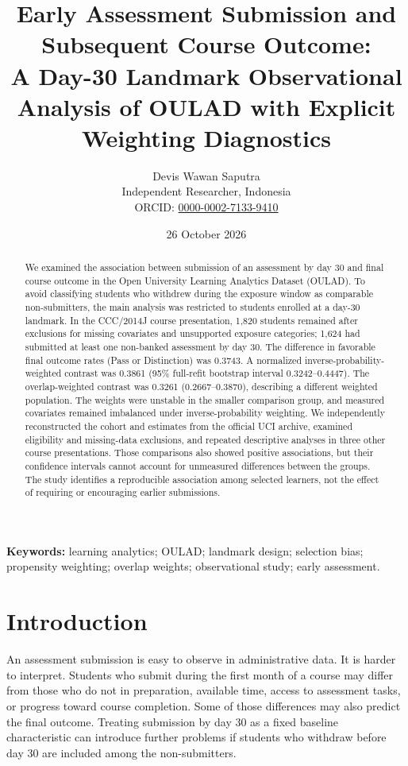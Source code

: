 \documentclass[10pt,a4paper]{article}
\title{Early Assessment Submission and Subsequent Course Outcome:\\ \large A Day-30 Landmark Observational Analysis of OULAD with Explicit Weighting Diagnostics}
\author{Devis Wawan Saputra\\\small Independent Researcher, Indonesia\\\small ORCID: \href{https://orcid.org/0000-0002-7133-9410}{0000-0002-7133-9410}}
\date{26 October 2026}
\begin{document}
\maketitle
\begin{abstract}
We examined the association between submission of an assessment by day 30 and final course outcome in the Open University Learning Analytics Dataset (OULAD). To avoid classifying students who withdrew during the exposure window as comparable non-submitters, the main analysis was restricted to students enrolled at a day-30 landmark. In the CCC/2014J course presentation, 1,820 students remained after exclusions for missing covariates and unsupported exposure categories; 1,624 had submitted at least one non-banked assessment by day 30. The difference in favorable final outcome rates (Pass or Distinction) was 0.3743. A normalized inverse-probability-weighted contrast was 0.3861 (95\% full-refit bootstrap interval 0.3242--0.4447). The overlap-weighted contrast was 0.3261 (0.2667--0.3870), describing a different weighted population. The weights were unstable in the smaller comparison group, and measured covariates remained imbalanced under inverse-probability weighting. We independently reconstructed the cohort and estimates from the official UCI archive, examined eligibility and missing-data exclusions, and repeated descriptive analyses in three other course presentations. Those comparisons also showed positive associations, but their confidence intervals cannot account for unmeasured differences between the groups. The study identifies a reproducible association among selected learners, not the effect of requiring or encouraging earlier submissions.

\end{abstract}
\textbf{Keywords:} learning analytics; OULAD; landmark design; selection bias; propensity weighting; overlap weights; observational study; early assessment.
\section{Introduction}
An assessment submission is easy to observe in administrative data. It is harder to interpret. Students who submit during the first month of a course may differ from those who do not in preparation, available time, access to assessment tasks, or progress toward course completion. Some of those differences may also predict the final outcome. Treating submission by day 30 as a fixed baseline characteristic can introduce further problems if students who withdraw before day 30 are included among the non-submitters.
\end{document}

